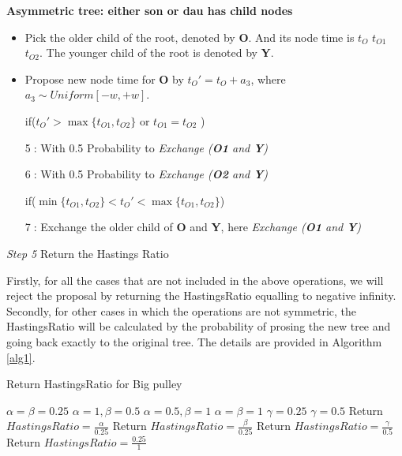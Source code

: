 \documentclass{bmcart}
\begin{document}
\textbf{Asymmetric tree: either \textbf{son} or \textbf{dau} has child nodes}
\begin{itemize}
\item Pick the older child of the root, denoted by \textbf{O}. And its node time is ${t_O}$ ${t_{O1}}$ ${t_{O2}}$. The younger child of the root is denoted by \textbf{Y}.

\item Propose new node time for \textbf{O} by ${t_O}' = {t_O} + {a_3}$, where ${a_3} \sim Uniform[ - w, + w]$.

if(${t_O}' > \max \{ {t_{O1}},{t_{O2}}\} $ or ${t_{O1}} = {t_{O2}}$ )

\textcircled5: With 0.5 Probability to \textit{Exchange (\textbf{O1} and \textbf{Y})}

\textcircled6: With 0.5 Probability to \textit{Exchange (\textbf{O2} and \textbf{Y})}

if($\min \{ {t_{O1}},{t_{O2}}\}  < {t_O}' < \max \{ {t_{O1}},{t_{O2}}\} $)

\textcircled7: Exchange the older child of \textbf{O} and \textbf{Y},  here \textit{Exchange (\textbf{O1}  and \textbf{Y})}
\end{itemize}

\emph{Step 5} Return the Hastings Ratio

Firstly, for all the cases that are not included in the above operations, we will reject the proposal by returning the HastingsRatio equalling to negative infinity. Secondly, for other cases in which the operations are not symmetric, the HastingsRatio will be calculated by the probability of prosing the new tree and going back exactly to the original tree. The details are provided in Algorithm \ref{alg1}.
\begin{algorithm}
\caption{Return HastingsRatio for Big pulley}
\label{alg1}
\begin{algorithmic}[1]
\STATE $\alpha  = \beta  = 0.25$
\STATE $\alpha  = 1,\beta  = 0.5$
\STATE $\alpha  = 0.5,\beta  = 1$
\STATE $\alpha  = \beta  = 1$
\ENDIF
{}
\STATE $\gamma  = 0.25$
\ELSE
\STATE $\gamma  = 0.5$
\ENDIF
{}
\STATE Return $HastingsRatio = \frac{\alpha }{{0.25}}$
\ENDFOR
{}
\STATE Return $HastingsRatio = \frac{\beta }{{0.25}}$
\ENDFOR
{}
\STATE Return $HastingsRatio = \frac{\gamma }{{0.5}}$
\ENDFOR
{}
\STATE Return $HastingsRatio = \frac{{0.25}}{1}$
\ENDFOR
\end{algorithmic}
\end{algorithm}
\end{document}
